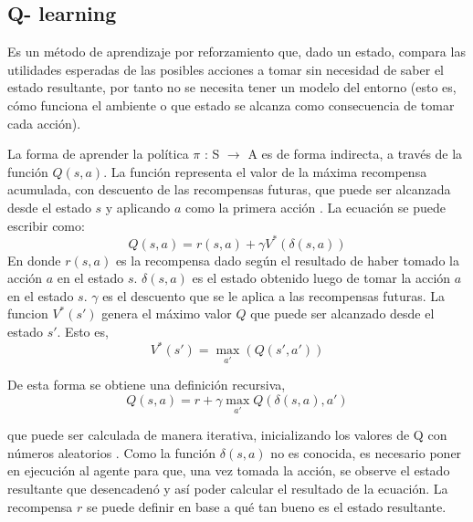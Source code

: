 \subsection{Q- learning}\label{subsec:Qlearning}

Es un método de aprendizaje por reforzamiento que, dado un estado, compara las utilidades esperadas de las posibles acciones a tomar sin necesidad de saber el estado resultante, por tanto no se necesita tener un modelo del entorno\cite{peterNorvig} (esto es, cómo funciona el ambiente o que estado se alcanza como consecuencia de tomar cada acción).

La forma de aprender la política $\pi$ : S $\to$ A es de forma indirecta, a través de la función $Q(s,a)$. La función representa el valor de la máxima recompensa acumulada, con descuento de las recompensas futuras, que puede ser alcanzada desde el estado $s$ y aplicando $a$ como la primera acción \cite{Mitchell}. La ecuación se puede escribir como:
\[Q(s,a) = r(s,a) + \gamma V^*(\delta(s,a))\]
En donde $r(s,a)$ es la recompensa dado según el resultado de haber tomado la acción $a$ en el estado $s$. $\delta(s,a)$ es el estado obtenido luego de tomar la acción $a$ en el estado $s$. $\gamma$ es el descuento que se le aplica a las recompensas futuras. La funcion $V^*(s')$ genera el máximo valor $Q$ que puede ser alcanzado desde el estado $s'$. Esto es,
\[V^*(s')= \max_{a'} (Q(s',a'))\] 

De esta forma se obtiene una definición recursiva,
\[Q(s,a) = r + \gamma \max_{a'} Q(\delta(s,a),a')\]


que puede ser calculada de manera iterativa, inicializando los valores de Q con números aleatorios \cite{Mitchell}. Como la función $\delta(s,a)$ no es conocida, es necesario poner en ejecución al agente para que, una vez tomada la acción, se observe el estado resultante que desencadenó y así poder calcular el resultado de la ecuación. La recompensa $r$ se puede definir en base  a qu\'e tan bueno es el estado resultante. 


